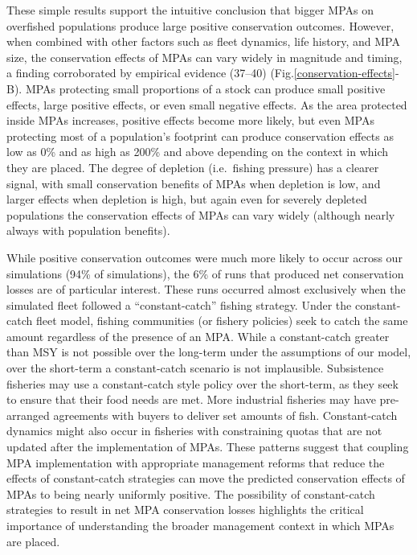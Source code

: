 \documentclass[9pt,twocolumn,twoside,lineno]{pnas-new}
\begin{document}
These simple results support the intuitive conclusion that bigger MPAs
on overfished populations produce large positive conservation outcomes.
However, when combined with other factors such as fleet dynamics, life
history, and MPA size, the conservation effects of MPAs can vary widely
in magnitude and timing, a finding corroborated by empirical evidence
(37--40) (Fig.\ref{conservation-effects}-B). MPAs protecting small
proportions of a stock can produce small positive effects, large
positive effects, or even small negative effects. As the area protected
inside MPAs increases, positive effects become more likely, but even
MPAs protecting most of a population's footprint can produce
conservation effects as low as 0\% and as high as 200\% and above
depending on the context in which they are placed. The degree of
depletion (i.e.~fishing pressure) has a clearer signal, with small
conservation benefits of MPAs when depletion is low, and larger effects
when depletion is high, but again even for severely depleted populations
the conservation effects of MPAs can vary widely (although nearly always
with population benefits).

While positive conservation outcomes were much more likely to occur
across our simulations (94\% of simulations), the 6\% of runs that
produced net conservation losses are of particular interest. These runs
occurred almost exclusively when the simulated fleet followed a
``constant-catch'' fishing strategy. Under the constant-catch fleet
model, fishing communities (or fishery policies) seek to catch the same
amount regardless of the presence of an MPA. While a constant-catch
greater than MSY is not possible over the long-term under the
assumptions of our model, over the short-term a constant-catch scenario
is not implausible. Subsistence fisheries may use a constant-catch style
policy over the short-term, as they seek to ensure that their food needs
are met. More industrial fisheries may have pre-arranged agreements with
buyers to deliver set amounts of fish. Constant-catch dynamics might
also occur in fisheries with constraining quotas that are not updated
after the implementation of MPAs. These patterns suggest that coupling
MPA implementation with appropriate management reforms that reduce the
effects of constant-catch strategies can move the predicted conservation
effects of MPAs to being nearly uniformly positive. The possibility of
constant-catch strategies to result in net MPA conservation losses
highlights the critical importance of understanding the broader
management context in which MPAs are placed.
\end{document}
